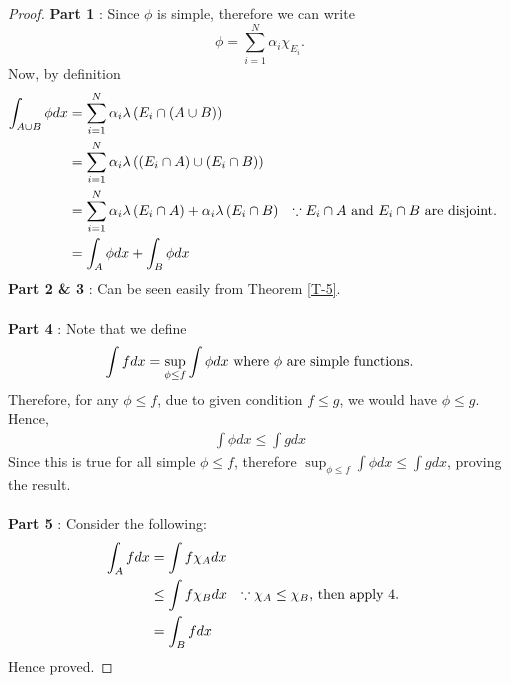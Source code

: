 \documentclass{article}
\theoremstyle{definition}
\theoremstyle{remark}
\theoremstyle{definition}
\theoremstyle{definition}
\theoremstyle{definition}
\newcommand{\union}{\cup}
\newcommand{\intrs}{\cap}
\newcommand{\lm}[1]{\lambda\left (#1\right )}
\begin{document}
\begin{proof}
	\textbf{Part 1} : Since $ \phi $ is simple, therefore we can write
	\[\phi = \sum_{i=1}^N \alpha_i \chi_{E_i}.\]
	Now, by definition
	\begin{align*}
		\int_{A\union B} \phi dx &= \sum_{i=1}^{N} \alpha_i \lm{E_i \intrs (A\union B)}\\
		&= \sum_{i=1}^{N} \alpha_i \lm{(E_i \intrs A) \union (E_i \intrs B)}\\
		&= \sum_{i=1}^{N} \alpha_{i} \lm{E_i \intrs A} + \alpha_i \lm{E_i \intrs B} &&\text{$ \because E_i\intrs A$ and $ E_i \intrs B $ are disjoint.}\\
		&= \int_{A} \phi dx + \int_{B} \phi dx
	\end{align*}
\textbf{Part 2 \& 3} : Can be seen easily from Theorem \ref{T-5}.\\\\
\textbf{Part 4} : Note that we define
\[\int fdx = \sup_{\phi \le f} \int \phi dx\text{ where $ \phi $ are simple functions.}\]
Therefore, for any $ \phi \le f $, due to given condition $ f\le g $, we would have $ \phi \le g $. Hence,
\begin{align*}
	\int \phi dx \le \int g dx 
\end{align*}
Since this is true for all simple $ \phi \le f $, therefore $ \sup_{\phi \le f} \int \phi dx \le \int gdx $, proving the result.\\\\
\textbf{Part 5} : Consider the following:
\begin{align*}
	\int_{A} f dx &= \int f\chi_{A} dx\\
	&\le \int f\chi_{B} dx &&\text{$ \because \chi_{A} \le \chi_{B}$, then apply 4.}\\
	&= \int_{B} f dx
\end{align*}
Hence proved.
\end{proof}
\end{document}
